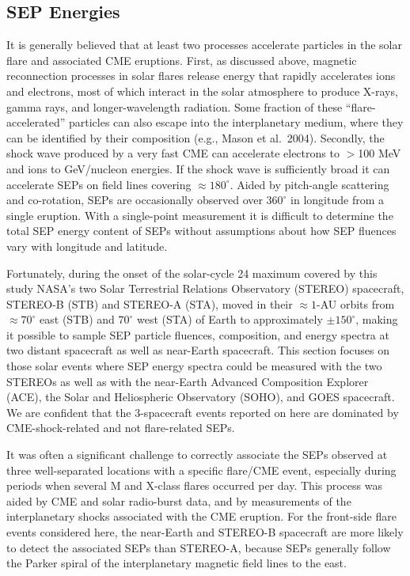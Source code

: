 \documentclass[10pt,preprint]{aastex}  %
\begin{document}
\subsection{		SEP Energies				}

It is generally believed that at least two processes accelerate 
particles in the solar flare and associated CME eruptions. 
First, as discussed above, magnetic 
reconnection processes in solar flares release energy that rapidly 
accelerates ions and electrons, most of which interact in the solar 
atmosphere to produce X-rays, gamma rays, and longer-wavelength 
radiation. Some fraction of these ``flare-accelerated'' particles 
can also escape into the interplanetary medium, where they can be 
identified by their composition (e.g., Mason et al.~2004). Secondly, 
the shock wave produced by a very fast CME can accelerate electrons 
to $>$100 MeV and ions to GeV/nucleon energies.  If the shock wave 
is sufficiently broad it can accelerate SEPs on field lines covering 
$\approx 180^\circ$. Aided by pitch-angle scattering and co-rotation, 
SEPs are occasionally observed over $360^\circ$ in longitude from a 
single eruption.  With a single-point measurement it is difficult to 
determine the total SEP energy content of SEPs without assumptions 
about how SEP fluences vary with longitude and latitude.  

Fortunately, during the onset of the solar-cycle 24 maximum covered 
by this study NASA's two Solar Terrestrial Relations Observatory 
(STEREO) spacecraft, STEREO-B (STB) and STEREO-A (STA), 
moved in their $\approx 1$-AU orbits from 
$\approx 70^\circ$ east (STB) and $70^\circ$ west (STA) of Earth 
to approximately $\pm 150^\circ$, making it possible to sample SEP 
particle fluences, composition, and energy spectra at two distant 
spacecraft as well as near-Earth spacecraft. This section focuses 
on those solar events where SEP energy spectra could be measured 
with the two STEREOs as well as with the near-Earth Advanced 
Composition Explorer (ACE), the Solar and Heliospheric Observatory 
(SOHO), and GOES spacecraft.
We are confident that the 3-spacecraft events reported on here are 
dominated by CME-shock-related and not flare-related SEPs.

It was often a significant challenge to correctly associate the 
SEPs observed at three well-separated locations with a specific 
flare/CME event, especially during periods when several M and X-class 
flares occurred per day. This process was aided by CME and solar 
radio-burst data, and by measurements of the interplanetary shocks 
associated with the CME eruption. For the front-side flare events 
considered here, the near-Earth and STEREO-B spacecraft are more 
likely to detect the associated SEPs than STEREO-A, because SEPs 
generally follow the Parker spiral of the interplanetary magnetic 
field lines to the east.  
\end{document}
